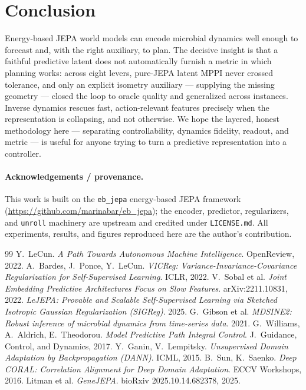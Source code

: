 \documentclass[11pt]{article}
\newcommand{\code}[1]{\texttt{#1}}
\begin{document}
\section{Conclusion}
Energy-based JEPA world models can encode microbial dynamics well enough to
forecast and, with the right auxiliary, to plan. The decisive insight is that a
faithful predictive latent does not automatically furnish a metric in which
planning works: across eight levers, pure-JEPA latent MPPI never crossed
tolerance, and only an explicit isometry auxiliary --- supplying the missing
geometry --- closed the loop to oracle quality and generalized across instances.
Inverse dynamics rescues fast, action-relevant features precisely when the
representation is collapsing, and not otherwise. We hope the layered, honest
methodology here --- separating controllability, dynamics fidelity, readout, and
metric --- is useful for anyone trying to turn a predictive representation into a
controller.

\paragraph{Acknowledgements / provenance.} This work is built on the
\texttt{eb\_jepa} energy-based JEPA framework
(\url{https://github.com/marinabar/eb_jepa}); the encoder, predictor,
regularizers, and \code{unroll} machinery are upstream and credited under
\code{LICENSE.md}. All experiments, results, and figures reproduced here are the
author's contribution.

\begin{thebibliography}{99}
 Y.~LeCun. \emph{A Path Towards Autonomous Machine
Intelligence}. OpenReview, 2022.
 A.~Bardes, J.~Ponce, Y.~LeCun. \emph{VICReg:
Variance-Invariance-Covariance Regularization for Self-Supervised Learning}.
ICLR, 2022.
 V.~Sobal et al. \emph{Joint Embedding Predictive
Architectures Focus on Slow Features}. arXiv:2211.10831, 2022.
 \emph{LeJEPA: Provable and Scalable Self-Supervised
Learning via Sketched Isotropic Gaussian Regularization (SIGReg)}. 2025.
 G.~Gibson et al. \emph{MDSINE2: Robust inference of microbial
dynamics from time-series data}. 2021.
 G.~Williams, A.~Aldrich, E.~Theodorou.
\emph{Model Predictive Path Integral Control}. J.\ Guidance, Control, and
Dynamics, 2017.
 Y.~Ganin, V.~Lempitsky. \emph{Unsupervised Domain
Adaptation by Backpropagation (DANN)}. ICML, 2015.
 B.~Sun, K.~Saenko. \emph{Deep CORAL: Correlation
Alignment for Deep Domain Adaptation}. ECCV Workshops, 2016.
 Litman et al. \emph{GeneJEPA}. bioRxiv
2025.10.14.682378, 2025.
\end{thebibliography}
\end{document}
